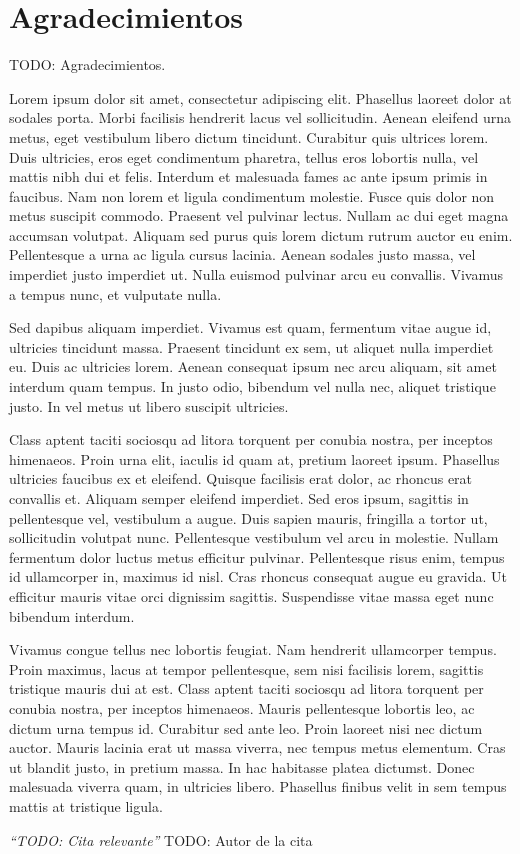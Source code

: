 \chapter*{Agradecimientos}

TODO: Agradecimientos.

Lorem ipsum dolor sit amet, consectetur adipiscing elit. Phasellus laoreet dolor at sodales porta. Morbi facilisis hendrerit lacus vel sollicitudin. Aenean eleifend urna metus, eget vestibulum libero dictum tincidunt. Curabitur quis ultrices lorem. Duis ultricies, eros eget condimentum pharetra, tellus eros lobortis nulla, vel mattis nibh dui et felis. Interdum et malesuada fames ac ante ipsum primis in faucibus. Nam non lorem et ligula condimentum molestie. Fusce quis dolor non metus suscipit commodo. Praesent vel pulvinar lectus. Nullam ac dui eget magna accumsan volutpat. Aliquam sed purus quis lorem dictum rutrum auctor eu enim. Pellentesque a urna ac ligula cursus lacinia. Aenean sodales justo massa, vel imperdiet justo imperdiet ut. Nulla euismod pulvinar arcu eu convallis. Vivamus a tempus nunc, et vulputate nulla.

Sed dapibus aliquam imperdiet. Vivamus est quam, fermentum vitae augue id, ultricies tincidunt massa. Praesent tincidunt ex sem, ut aliquet nulla imperdiet eu. Duis ac ultricies lorem. Aenean consequat ipsum nec arcu aliquam, sit amet interdum quam tempus. In justo odio, bibendum vel nulla nec, aliquet tristique justo. In vel metus ut libero suscipit ultricies.

Class aptent taciti sociosqu ad litora torquent per conubia nostra, per inceptos himenaeos. Proin urna elit, iaculis id quam at, pretium laoreet ipsum. Phasellus ultricies faucibus ex et eleifend. Quisque facilisis erat dolor, ac rhoncus erat convallis et. Aliquam semper eleifend imperdiet. Sed eros ipsum, sagittis in pellentesque vel, vestibulum a augue. Duis sapien mauris, fringilla a tortor ut, sollicitudin volutpat nunc. Pellentesque vestibulum vel arcu in molestie. Nullam fermentum dolor luctus metus efficitur pulvinar. Pellentesque risus enim, tempus id ullamcorper in, maximus id nisl. Cras rhoncus consequat augue eu gravida. Ut efficitur mauris vitae orci dignissim sagittis. Suspendisse vitae massa eget nunc bibendum interdum.

Vivamus congue tellus nec lobortis feugiat. Nam hendrerit ullamcorper tempus. Proin maximus, lacus at tempor pellentesque, sem nisi facilisis lorem, sagittis tristique mauris dui at est. Class aptent taciti sociosqu ad litora torquent per conubia nostra, per inceptos himenaeos. Mauris pellentesque lobortis leo, ac dictum urna tempus id. Curabitur sed ante leo. Proin laoreet nisi nec dictum auctor. Mauris lacinia erat ut massa viverra, nec tempus metus elementum. Cras ut blandit justo, in pretium massa. In hac habitasse platea dictumst. Donec malesuada viverra quam, in ultricies libero. Phasellus finibus velit in sem tempus mattis at tristique ligula.

\begin{flushright}
\textit{``TODO: Cita relevante''}
TODO: Autor de la cita
\end{flushright}
